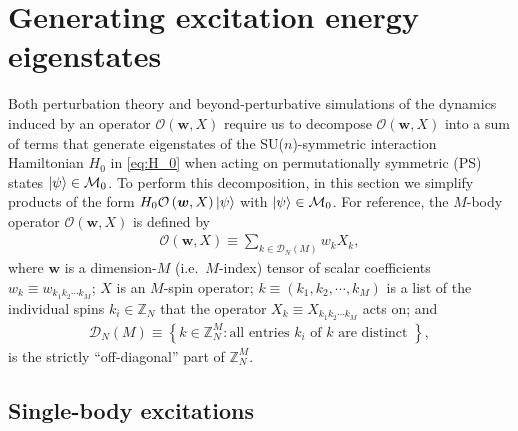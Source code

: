 \documentclass[nofootinbib,notitlepage,11pt]{revtex4-2}
\renewcommand{\t}{\text} %
\newcommand{\p}[1]{\left(#1\right)} %
\renewcommand{\set}[1]{\left\{#1\right\}} %
\newcommand{\m}{\bm} %
\newcommand{\1}{\mathds{1}}
\newcommand{\D}{\mathcal{D}}
\newcommand{\M}{\mathcal{M}}
\renewcommand{\O}{\mathcal{O}}
\newcommand{\ZZ}{\mathbb{Z}}
\begin{document}
\section{Generating excitation energy eigenstates}
\label{sec:eigenstates}

Both perturbation theory and beyond-perturbative simulations of the
dynamics induced by an operator $\O\p{\m w,X}$ require us to decompose
$\O\p{\m w,X}$ into a sum of terms that generate eigenstates of the
SU($n$)-symmetric interaction Hamiltonian $H_0$ in \eqref{eq:H_0} when
acting on permutationally symmetric (PS) states $\ket\psi\in\M_0$.  To
perform this decomposition, in this section we simplify products of
the form $H_0\O\p{\m w,X}\ket\psi$ with $\ket\psi\in\M_0$.  For
reference, the $M$-body operator $\O\p{\m w,X}$ is defined by
\begin{align}
  \O\p{\m w,X} \equiv \sum_{k\in\D_N\p{M}} w_k X_k,
\end{align}
where $\m w$ is a dimension-$M$ (i.e.~$M$-index) tensor of scalar
coefficients $w_k\equiv w_{k_1k_2\cdots k_M}$; $X$ is an $M$-spin
operator; $k\equiv\p{k_1,k_2,\cdots,k_M}$ is a list of the individual
spins $k_i\in\ZZ_N$ that the operator $X_k\equiv X_{k_1k_2\cdots k_M}$
acts on; and
\begin{align}
  \D_N\p{M} \equiv
  \set{ k \in \ZZ_N^M: \t{all entries $k_i$ of $k$ are distinct } },
\end{align}
is the strictly ``off-diagonal'' part of $\ZZ_N^M$.

\subsection{Single-body excitations}
\label{sec:single_body_eigenstates}
\end{document}
